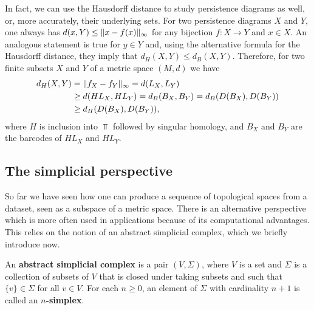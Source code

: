 In fact, we can use the Hausdorff distance to study persistence diagrams as well, or, more accurately, their underlying sets. For two persistence diagrams $X$ and $Y$, one always has $d(x, Y) \leq \lVert x - f(x)\rVert_\infty$ for any bijection $f: X \to Y$ and $x \in X$. An analogous statement is true for $y \in Y$ and, using the alternative formula for the Hausdorff distance, they imply that $d_H(X,Y) \leq d_B(X,Y)$. Therefore, for two finite subsets $X$ and $Y$ of a metric space $(M,d)$ we have
\begin{align*}
    d_H(X,Y) &= \lVert f_X - f_Y\rVert_\infty = d(L_X, L_Y) \\
    &\geq d(HL_X, HL_Y) = d_B(B_X, B_Y) = d_B(D(B_X), D(B_Y)) \\
    &\geq d_H(D(B_X), D(B_Y)),
\end{align*}
where $H$ is inclusion into $\Top$ followed by singular homology, and $B_X$ and $B_Y$ are the barcodes of $HL_X$ and $HL_Y$.

\subsection{The simplicial perspective}
\label{sec:simplicial}

So far we have seen how one can produce a sequence of topological spaces from a dataset, seen as a subspace of a metric space. There is an alternative perspective which is more often used in applications because of its computational advantages. This relies on the notion of an abstract simplicial complex, which we briefly introduce now.

\begin{definition}\label{def:abstract_simplicial_complex}
    An \textbf{abstract simplicial complex} is a pair $(V,\Sigma)$, where $V$ is a set and $\Sigma$ is a collection of subsets of $V$ that is closed under taking subsets and such that $\{v\} \in \Sigma$ for all $v \in V$. For each $n \geq 0$, an element of $\Sigma$ with cardinality $n+1$ is called an \textbf{$n$-simplex}.
\end{definition}


